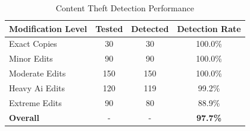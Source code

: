 
\begin{table}[h]
\centering
\caption{Content Theft Detection Performance}
\label{tab:theft_detection}
\begin{tabular}{lccc}
\hline
\textbf{Modification Level} & \textbf{Tested} & \textbf{Detected} & \textbf{Detection Rate} \\
\hline
Exact Copies & 30 & 30 & 100.0\% \\
Minor Edits & 90 & 90 & 100.0\% \\
Moderate Edits & 150 & 150 & 100.0\% \\
Heavy Ai Edits & 120 & 119 & 99.2\% \\
Extreme Edits & 90 & 80 & 88.9\% \\
\hline
\textbf{Overall} & - & - & \textbf{97.7\%} \\
\hline
\end{tabular}
\end{table}
